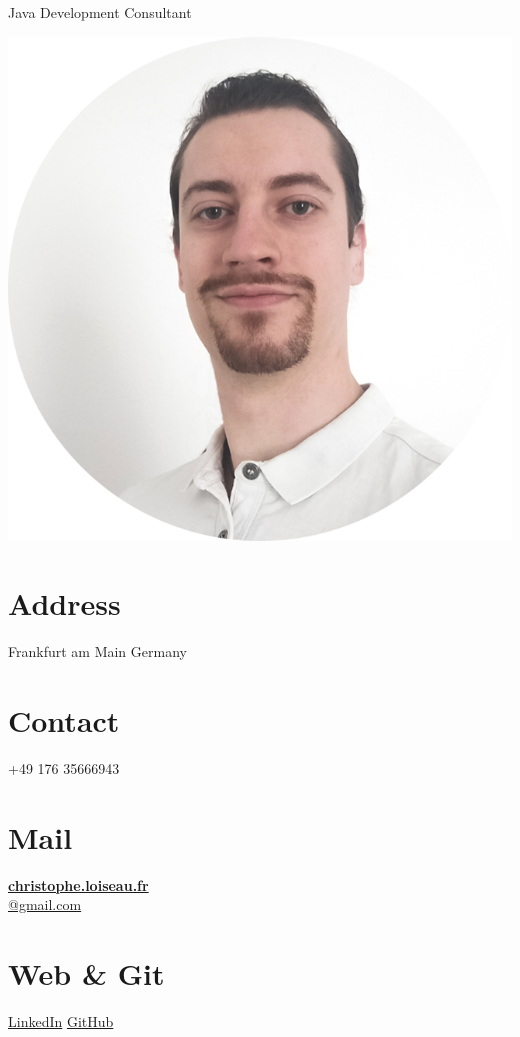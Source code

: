 \documentclass[]{friggeri-cv}
\begin{document}
      {Java Development Consultant}
      

\begin{aside}
  \includegraphics[scale=0.18]{img/circle_650.png}
  \section{Address}
    Frankfurt am Main
    Germany
    ~
  \section{Contact}
    +49 176 35666943
    ~
  \section{Mail}
    \href{mailto:christophe.loiseau.fr@gmail.com}{\textbf{christophe.loiseau.fr}\\@gmail.com}
    ~
  \section{Web \& Git}
    \href{http://www.linkedin.com/in/christophe-loiseau-it}{LinkedIn}
    \href{https://github.com/ununhexium}{GitHub}
    ~

\end{aside}
\end{document}
